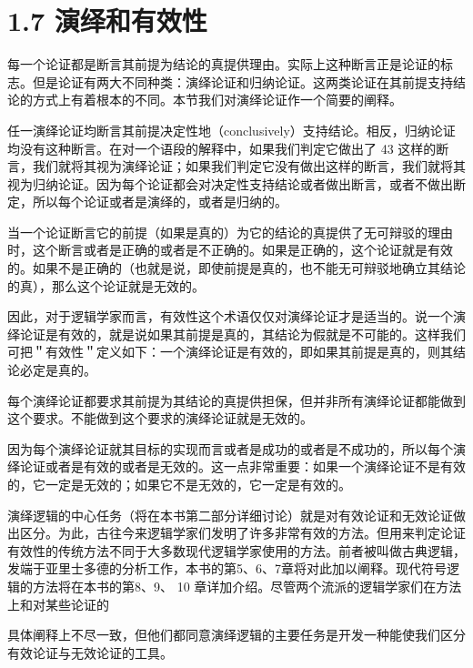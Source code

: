 \section*{1.7 演绎和有效性}
每一个论证都是断言其前提为结论的真提供理由。实际上这种断言正是论证的标志。但是论证有两大不同种类：演绎论证和归纳论证。这两类论证在其前提支持结论的方式上有着根本的不同。本节我们对演绎论证作一个简要的阐释。

任一演绎论证均断言其前提决定性地（conclusively）支持结论。相反，归纳论证均没有这种断言。在对一个语段的解释中，如果我们判定它做出了 43 这样的断言，我们就将其视为演绎论证；如果我们判定它没有做出这样的断言，我们就将其视为归纳论证。因为每个论证都会对决定性支持结论或者做出断言，或者不做出断定，所以每个论证或者是演绎的，或者是归纳的。

当一个论证断言它的前提（如果是真的）为它的结论的真提供了无可辩驳的理由时，这个断言或者是正确的或者是不正确的。如果是正确的，这个论证就是有效的。如果不是正确的（也就是说，即使前提是真的，也不能无可辩驳地确立其结论的真），那么这个论证就是无效的。

因此，对于逻辑学家而言，有效性这个术语仅仅对演绎论证才是适当的。说一个演绎论证是有效的，就是说如果其前提是真的，其结论为假就是不可能的。这样我们可把＂有效性＂定义如下：一个演绎论证是有效的，即如果其前提是真的，则其结论必定是真的。

每个演绎论证都要求其前提为其结论的真提供担保，但并非所有演绎论证都能做到这个要求。不能做到这个要求的演绎论证就是无效的。

因为每个演绎论证就其目标的实现而言或者是成功的或者是不成功的，所以每个演绎论证或者是有效的或者是无效的。这一点非常重要：如果一个演绎论证不是有效的，它一定是无效的；如果它不是无效的，它一定是有效的。

演绎逻辑的中心任务（将在本书第二部分详细讨论）就是对有效论证和无效论证做出区分。为此，古往今来逻辑学家们发明了许多非常有效的方法。但用来判定论证有效性的传统方法不同于大多数现代逻辑学家使用的方法。前者被叫做古典逻辑，发端于亚里士多德的分析工作，本书的第5、6、7章将对此加以阐释。现代符号逻辑的方法将在本书的第8、9、 10 章详加介绍。尽管两个流派的逻辑学家们在方法上和对某些论证的

具体阐释上不尽一致，但他们都同意演绎逻辑的主要任务是开发一种能使我们区分有效论证与无效论证的工具。 